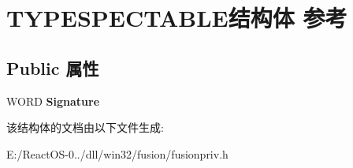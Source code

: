 \hypertarget{struct_t_y_p_e_s_p_e_c_t_a_b_l_e}{}\section{T\+Y\+P\+E\+S\+P\+E\+C\+T\+A\+B\+L\+E结构体 参考}
\label{struct_t_y_p_e_s_p_e_c_t_a_b_l_e}
\subsection*{Public 属性}
\begin{DoxyCompactItemize}
\item 
\mbox{\label{struct_t_y_p_e_s_p_e_c_t_a_b_l_e_a19e02ea43c3241c0b6d6e01183914836}} 
W\+O\+RD {\bfseries Signature}
\end{DoxyCompactItemize}


该结构体的文档由以下文件生成\+:\begin{DoxyCompactItemize}
\item 
E\+:/\+React\+O\+S-\/0../dll/win32/fusion/fusionpriv.\+h\end{DoxyCompactItemize}
